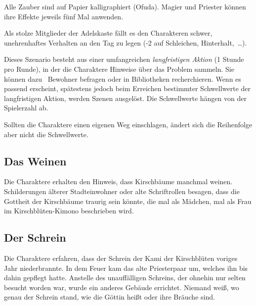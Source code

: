{		\noindent
		Alle Zauber sind auf Papier kalligraphiert (Ofuda). Magier und Priester können ihre Effekte jeweils fünf Mal anwenden.

		Als stolze Mitglieder der Adelskaste fällt es den Charakteren schwer, unehrenhaftes Verhalten an den Tag zu legen (-2 auf Schleichen, Hinterhalt,~\ldots).


		\noindent
		Dieses Szenario besteht aus einer umfangreichen \emph{langfristigen Aktion} (1 Stunde pro Runde), in der die Charaktere Hinweise über das Problem sammeln. Sie können dazu \zB\ Bewohner befragen oder in Bibliotheken recherchieren. Wenn es passend erscheint, spätestens jedoch beim Erreichen bestimmter Schwellwerte der langfristigen Aktion, werden Szenen ausgelöst. Die Schwellwerte hängen von der Spielerzahl ab.


		\noindent
		Sollten die Charaktere einen eigenen Weg einschlagen, ändert sich die Reihenfolge aber nicht die Schwellwerte.

		\subsection{Das Weinen}

			Die Charaktere erhalten den Hinweis, dass Kirschbäume manchmal weinen. Schilderungen älterer Stadteinwohner oder alte Schriftrollen besagen, dass die Gottheit der Kirschbäume traurig sein könnte, die mal als Mädchen, mal als Frau im Kirschblüten-Kimono beschrieben wird.

		\subsection{Der Schrein}

			Die Charaktere erfahren, dass der Schrein der Kami der Kirschblüten voriges Jahr niederbrannte. In dem Feuer kam das alte Priesterpaar um, welches ihn bis dahin gepflegt hatte. Anstelle des unauffälligen Schreins, der ohnehin nur selten besucht worden war, wurde ein anderes Gebäude errichtet. Niemand weiß, wo genau der Schrein stand,  wie die Göttin heißt oder ihre Bräuche sind.

}
